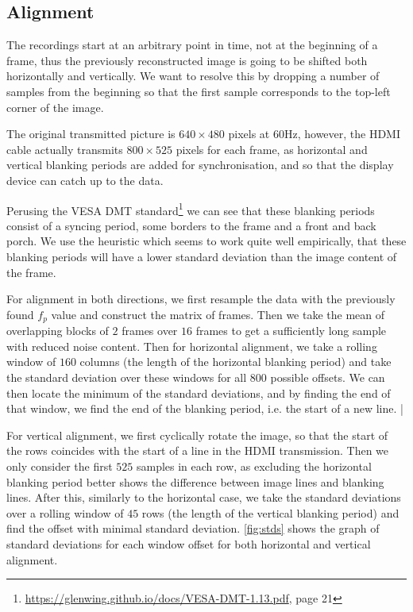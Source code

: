 \documentclass{article}
\begin{document}
\subsection{Alignment}
\label{sec:alignment}

The recordings start at an arbitrary point in time, not at the beginning of a frame, thus the previously reconstructed image is going to be shifted both horizontally and vertically. We want to resolve this by dropping a number of samples from the beginning so that the first sample corresponds to the top-left corner of the image.

The original transmitted picture is $640 \times 480$ pixels at $60$Hz, however, the HDMI cable actually transmits $800 \times 525$ pixels for each frame, as horizontal and vertical blanking periods are added for synchronisation, and so that the display device can catch up to the data. 

Perusing the VESA DMT standard\footnote{\url{https://glenwing.github.io/docs/VESA-DMT-1.13.pdf}, page 21} we can see that these blanking periods consist of a syncing period, some borders to the frame and a front and back porch. We use the heuristic which seems to work quite well empirically, that these blanking periods will have a lower standard deviation than the image content of the frame.

For alignment in both directions, we first resample the data with the previously found $f_p$ value and construct the matrix of frames. Then we take the mean of overlapping blocks of $2$ frames over $16$ frames to get a sufficiently long sample with reduced noise content. Then for horizontal alignment, we take a rolling window of $160$ columns (the length of the horizontal blanking period) and take the standard deviation over these windows for all $800$ possible offsets. We can then locate the minimum of the standard deviations, and by finding the end of that window, we find the end of the blanking period, i.e. the start of a new line. |

For vertical alignment, we first cyclically rotate the image, so that the start of the rows coincides with the start of a line in the HDMI transmission. Then we only consider the first $525$ samples in each row, as excluding the horizontal blanking period better shows the difference between image lines and blanking lines. After this, similarly to the horizontal case, we take the standard deviations over a rolling window of $45$ rows (the length of the vertical blanking period) and find the offset with minimal standard deviation. \autoref{fig:stds} shows the graph of standard deviations for each window offset for both horizontal and vertical alignment.
\end{document}
